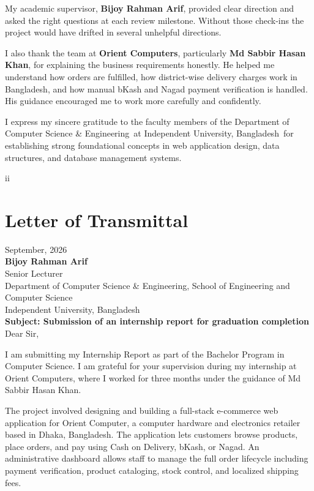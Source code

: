 \documentclass[12pt,a4paper,oneside]{report}
\newcommand{\academicSupervisor}{Bijoy Rahman Arif}
\newcommand{\academicSupervisorTitle}{Senior Lecturer}
\newcommand{\industrySupervisor}{Md Sabbir Hasan Khan}
\newcommand{\industryCompany}{Orient Computers}
\newcommand{\submissionDate}{12 September, 2026}
\newcommand{\departmentName}{Department of Computer Science \& Engineering}
\newcommand{\schoolName}{School of Engineering and Computer Science}
\newcommand{\universityName}{Independent University, Bangladesh}
\begin{document}
\vspace{0.4cm}
My academic supervisor, \textbf{\academicSupervisor}, provided clear direction and asked the right questions at each review milestone. Without those check-ins the project would have drifted in several unhelpful directions.

\vspace{0.4cm}
I also thank the team at \textbf{\industryCompany}, particularly \textbf{\industrySupervisor}, for explaining the business requirements honestly. He helped me understand how orders are fulfilled, how district-wise delivery charges work in Bangladesh, and how manual bKash and Nagad payment verification is handled. His guidance encouraged me to work more carefully and confidently.

\vspace{0.4cm}
I express my sincere gratitude to the faculty members of the \departmentName\ at \universityName\ for establishing strong foundational concepts in web application design, data structures, and database management systems.

\vfill
\begin{center}\small ii\end{center}

\newpage
\chapter*{Letter of Transmittal}

\noindent
\submissionDate \\[0.3cm]
\textbf{\academicSupervisor} \\
\academicSupervisorTitle \\
\departmentName, \schoolName \\
\universityName \\[0.4cm]
\textbf{Subject: Submission of an internship report for graduation completion} \\[0.4cm]
Dear Sir,

\vspace{0.3cm}
I am submitting my Internship Report as part of the Bachelor Program in Computer Science. I am grateful for your supervision during my internship at \industryCompany, where I worked for three months under the guidance of \industrySupervisor.

\vspace{0.3cm}
The project involved designing and building a full-stack e-commerce web application for Orient Computer, a computer hardware and electronics retailer based in Dhaka, Bangladesh. The application lets customers browse products, place orders, and pay using Cash on Delivery, bKash, or Nagad. An administrative dashboard allows staff to manage the full order lifecycle including payment verification, product cataloging, stock control, and localized shipping fees.
\end{document}
